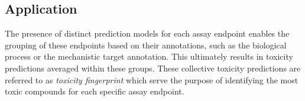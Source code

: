 \subsection{Application}
The presence of distinct prediction models for each assay endpoint enables the grouping of these endpoints based on their annotations, such as the biological process or the mechanistic target annotation. This ultimately results in toxicity predictions averaged within these groups. These collective toxicity predictions are referred to as \emph{toxicity fingerprint} which serve the purpose of identifying the most toxic compounds for each specific assay endpoint.


